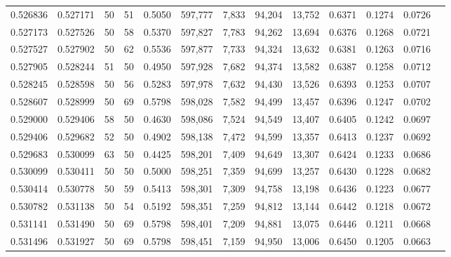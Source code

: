 \begin{tabular}{rrrrrrrrrrrrr}
0.526836 & 0.527171 &    50 &  51 &                                     0.5050 & 597,777 &   7,833 &  94,204 &  13,752 & 0.6371 & 0.1274 & 0.0726 \\
0.527173 & 0.527526 &    50 &  58 &                                     0.5370 & 597,827 &   7,783 &  94,262 &  13,694 & 0.6376 & 0.1268 & 0.0721 \\
0.527527 & 0.527902 &    50 &  62 &                                     0.5536 & 597,877 &   7,733 &  94,324 &  13,632 & 0.6381 & 0.1263 & 0.0716 \\
0.527905 & 0.528244 &    51 &  50 &                                     0.4950 & 597,928 &   7,682 &  94,374 &  13,582 & 0.6387 & 0.1258 & 0.0712 \\
0.528245 & 0.528598 &    50 &  56 &                                     0.5283 & 597,978 &   7,632 &  94,430 &  13,526 & 0.6393 & 0.1253 & 0.0707 \\
0.528607 & 0.528999 &    50 &  69 &                                     0.5798 & 598,028 &   7,582 &  94,499 &  13,457 & 0.6396 & 0.1247 & 0.0702 \\
0.529000 & 0.529406 &    58 &  50 &                                     0.4630 & 598,086 &   7,524 &  94,549 &  13,407 & 0.6405 & 0.1242 & 0.0697 \\
0.529406 & 0.529682 &    52 &  50 &                                     0.4902 & 598,138 &   7,472 &  94,599 &  13,357 & 0.6413 & 0.1237 & 0.0692 \\
0.529683 & 0.530099 &    63 &  50 &                                     0.4425 & 598,201 &   7,409 &  94,649 &  13,307 & 0.6424 & 0.1233 & 0.0686 \\
0.530099 & 0.530411 &    50 &  50 &                                     0.5000 & 598,251 &   7,359 &  94,699 &  13,257 & 0.6430 & 0.1228 & 0.0682 \\
0.530414 & 0.530778 &    50 &  59 &                                     0.5413 & 598,301 &   7,309 &  94,758 &  13,198 & 0.6436 & 0.1223 & 0.0677 \\
0.530782 & 0.531138 &    50 &  54 &                                     0.5192 & 598,351 &   7,259 &  94,812 &  13,144 & 0.6442 & 0.1218 & 0.0672 \\
0.531141 & 0.531490 &    50 &  69 &                                     0.5798 & 598,401 &   7,209 &  94,881 &  13,075 & 0.6446 & 0.1211 & 0.0668 \\
0.531496 & 0.531927 &    50 &  69 &                                     0.5798 & 598,451 &   7,159 &  94,950 &  13,006 & 0.6450 & 0.1205 & 0.0663 \\

\end{tabular}
